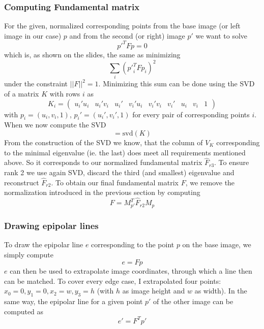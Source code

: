 \documentclass{paper}
\begin{document}
\subsubsection{Computing Fundamental matrix}
For the given, normalized corresponding points from the base image (or left image in our case) $p$ and from the second (or right) image $p'$ 
we want to solve 
\begin{equation}
	p'^T F p = 0
\end{equation}
which is, as shown on the slides, the same as minimizing
\begin{equation}
	\sum_i ({p'}_i^T F p_i)^2
\end{equation}
under the constraint $||F||^2 = 1$. Minimizing this sum can be done using the SVD of a matrix $K$ with rows $i$ as
\begin{equation}
K_i = 
\begin{pmatrix}
 u_i'u_i & u_i'v_i & u_i' & v_i'u_i & v_i'v_i & v_i' & u_i & v_i & 1 
\end{pmatrix}
\end{equation}
with $p_i = (u_i,v_i,1)$, $p_i' = (u_i',v_i',1)$ for every pair of corresponding points $i$. When we now compute the SVD
\begin{equation}
	[U_K, D_K, V_K] = \text{svd}(K)
\end{equation}
From the construction of the SVD we know, that the column of $V_K$ corresponding to the minimal eigenvalue (ie. the last) does meet all
requirements mentioned above. So it corresponds to our normalized
fundamental matrix $\hat{F}_{r3}$. To ensure rank 2 we use again SVD, 
discard the third (and smallest) eigenvalue and reconstruct $\hat{F}_{r2}$. 
To obtain our final fundamental matrix $F$, we remove the normalization introduced in the previous section by computing 
   \begin{equation}
   F = M_{p'}^ T \hat{F}_{r2} M_p
   \end{equation}
   
\subsubsection{Drawing epipolar lines}
To draw the epipolar line $e$ corresponding to the point $p$ on the base image, we simply compute
\begin{equation}
	e = F p
\end{equation}
$e$ can then be used to extrapolate image coordinates, through which a line then can be matched. 
To cover every edge case, I extrapolated four points: $x_0 = 0, y_1 = 0, x_2 = w, y_3 = h$ (with $h$ as image height and $w$ as width). 
In the same way, the epipolar line for a given point $p'$ of the other image can be computed as
\begin{equation}
	e' = F^Tp'
\end{equation} 
\end{document}
